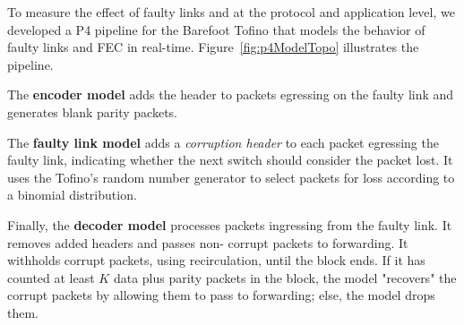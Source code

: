 



To measure the effect of faulty links and \OurSys at the protocol and
application level, we developed a P4 pipeline for the Barefoot Tofino that
models the behavior of faulty links and FEC in real-time.
Figure~\ref{fig:p4ModelTopo} illustrates the pipeline.




The \textbf{encoder model} adds the \OurSys header to packets egressing on
the faulty link and generates blank parity packets. 


The \textbf{faulty link model} adds a \emph{corruption header} to each packet
egressing the faulty link, indicating whether the next switch should
consider the packet lost. It uses the Tofino's  random number generator to
select packets for loss according to a binomial  distribution.


Finally, the \textbf{decoder model} processes packets ingressing from the
faulty link. It removes added headers and passes non- corrupt packets to
forwarding. It withholds corrupt packets, using recirculation, until the block
ends. If it has counted at least $K$ data plus parity packets in the block,
the model "recovers" the corrupt packets by allowing them to pass to
forwarding; else, the model drops them.

